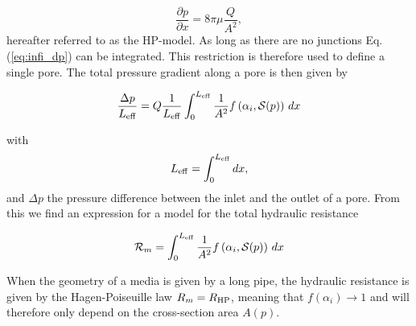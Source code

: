 \documentclass[draft]{agujournal2019}
\begin{document}
\begin{equation}
	\frac{\partial p}{\partial x} = 8 \pi \mu\frac{Q}{A^2}, \label{eq:HP}
\end{equation}
hereafter referred to as the HP-model. As long as there are no junctions Eq.(\ref{eq:infi_dp}) can be integrated. This restriction is therefore used to define a single pore. The total pressure gradient along a pore is then given by

\begin{equation}
	\frac{\Delta p}{L_{\rm{eff}}} =  Q \frac{1}{L_{\rm{eff}}}\int^{L_{\rm{eff}}}_{0}\frac{1}{A^2}f\left(\alpha_i,\mathcal{S}(p)\right)\,dx
\end{equation}

with 
\begin{equation}
	L_{\rm{eff}} = \int^{L_{\rm{eff}}}_{0} dx,
\end{equation}
and $\Delta p$ the pressure difference between the inlet and the outlet of a pore. From this we find an expression for a model for the total hydraulic resistance 

\begin{equation}
	\mathcal{R}_m = \int^{L_{\rm{eff}}}_{0}\frac{1}{A^2}f\left(\alpha_i,\mathcal{S}(p)\right)\,dx\label{eq:R_model}
\end{equation}

When the geometry of a media is given by a long pipe, the hydraulic resistance is given by the Hagen-Poiseuille law $R_m = R_{\rm{HP}}$, meaning that $f(\alpha_i)\rightarrow 1$ and will therefore only depend on the cross-section area  $A(p)$.
\end{document}
